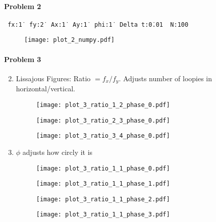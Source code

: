 \documentclass[12pt, oneside, letterpaper, fleqn]{article}
\begin{document}
\paragraph{Problem 2}
\texttt{
fx:\. 1\,
fy:\. 2\,
Ax:\. 1\,
Ay:\. 1\,
phi:\. 1\,
Delta t:\. 0.01\,
N:\. 100\,}
\begin{figure}[htbp]
\texttt{[image: plot\_2\_numpy.pdf]}
\end{figure}

\paragraph{Problem 3}
\begin{enumerate}
\setcounter{enumi}{1}
\item Lissajous Figures: Ratio $= f_x/f_y$. Adjusts number of loopies in
horizontal/vertical.
\begin{figure}[htbp]
\texttt{[image: plot\_3\_ratio\_1\_2\_phase\_0.pdf]}
\end{figure}
\begin{figure}[htbp]
\texttt{[image: plot\_3\_ratio\_2\_3\_phase\_0.pdf]}
\end{figure}
\begin{figure}[htbp]
\texttt{[image: plot\_3\_ratio\_3\_4\_phase\_0.pdf]}
\end{figure}

\pagebreak
\item $\phi$ adjusts how circly it is
\begin{figure}[htbp]
\texttt{[image: plot\_3\_ratio\_1\_1\_phase\_0.pdf]}
\end{figure}
\begin{figure}[htbp]
\texttt{[image: plot\_3\_ratio\_1\_1\_phase\_1.pdf]}
\end{figure}
\begin{figure}[htbp]
\texttt{[image: plot\_3\_ratio\_1\_1\_phase\_2.pdf]}
\end{figure}
\begin{figure}[htbp]
\texttt{[image: plot\_3\_ratio\_1\_1\_phase\_3.pdf]}
\end{figure}
\end{enumerate}
\end{document}
